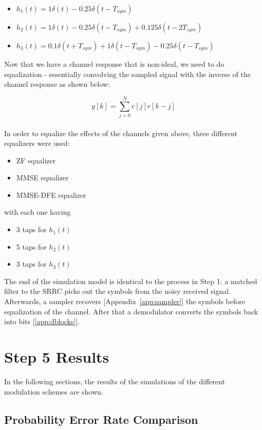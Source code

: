\documentclass[]{article}
\begin{document}
\begin{itemize}
\item $h_1(t) = 1\delta(t) - 0.25\delta(t - T_{sym})  $
\item $h_2(t) = 1\delta(t) - 0.25\delta(t - T_{sym})   + 0.125\delta(t - 2T_{sym}) $
\item $h_3(t) = 0.1\delta(t + T_{sym}) +1\delta(t - T_{sym}) - 0.25\delta(t - T_{sym})   $
\end{itemize} 

Now that we have a channel response that is non-ideal, we need to do equalization - essentially convolving the sampled signal with the inverse of the channel response as shown below: 

\begin{equation}
\label{eq:channel}
y\left[k\right] = \sum_{j=0}^N c[j]r\left[k-j\right]
\end{equation}
\\
In order to equalize the effects of the channels given above, three different equalizers were used: 

\begin{itemize}
\item ZF equalizer
\item MMSE equalizer
\item MMSE-DFE equalizer
\end{itemize}

with each one having
	\begin{itemize}
	\item 3 taps for $h_1(t)$
	\item 5 taps for $h_2(t)$
	\item 3 taps for $h_3(t)$
	\end{itemize}
	
The end of the simulation model is identical to the process in Step 1: a matched filter to the SRRC picks out the symbols from the noisy received signal.  Afterwards, a sampler recovers [Appendix~\ref{app:sampler}] the symbols before equalization of the channel. After that a demodulator converts the symbols back into bits [\ref{app:dblocks}].  



\section{Step 5 Results}
\label{sec:results}
In the following sections, the results of the simulations of the different modulation schemes are shown. 

\subsection{Probability Error Rate Comparison}
\label{sec:compare}
\end{document}
